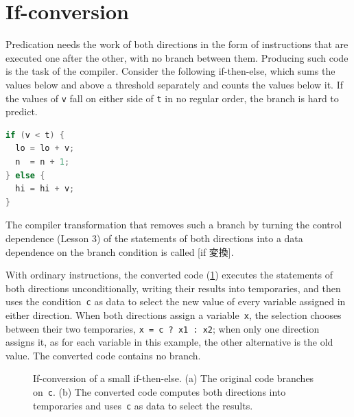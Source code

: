 \documentclass[../main.tex]{subfiles}
\begin{document}
\section{If-conversion}
\label{sec:l05-if-conversion}

Predication needs the work of both directions in the form of instructions
that are executed one after the other, with no branch between
them.  Producing
such code is the task of the compiler.  Consider the following if-then-else, which sums the
values below and above a threshold separately and counts the values below it.
If the values of \texttt{v} fall on either side of \texttt{t} in no regular
order, the branch is hard to predict.
\begin{lstlisting}[language=C, numbers=none]
if (v < t) {
  lo = lo + v;
  n  = n + 1;
} else {
  hi = hi + v;
}
\end{lstlisting}

\begin{definition}[If-conversion]
  \label{def:l05-if-conversion}
  The compiler transformation that removes such a branch by turning the
  control dependence (Lesson 3) of the statements of both directions into a
  data dependence on the branch condition is called
  [if 変換].
\end{definition}

With ordinary instructions, the converted code (\cref{fig:l05-if-conversion})
executes the statements of both directions unconditionally, writing their
results into temporaries, and then uses the condition~\texttt{c} as data to
select the new value of every variable assigned in either
direction.  When both
directions assign a variable~\texttt{x}, the selection chooses between their
two temporaries, \texttt{x = c ? x1 : x2}; when only one direction assigns
it, as for each variable in this example, the other alternative is the old
value.  The converted code contains no branch.

\begin{figure}[htbp]
  \centering
  
  \caption{If-conversion of a small if-then-else.  (a) The original code
    branches on~\texttt{c}.  (b) The converted code computes both directions
    into temporaries and uses~\texttt{c} as data to select the results.}
  \label{fig:l05-if-conversion}
\end{figure}
\end{document}
